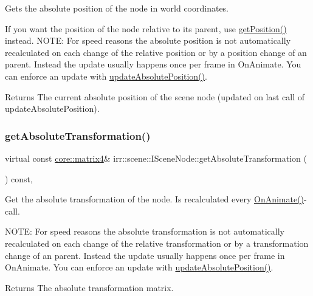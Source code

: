 Gets the absolute position of the node in world coordinates. 

If you want the position of the node relative to its parent, use \hyperlink{classirr_1_1scene_1_1ISceneNode_af5686d35e868e7d295c2d2cb84799d20}{get\+Position()} instead. N\+O\+TE\+: For speed reasons the absolute position is not automatically recalculated on each change of the relative position or by a position change of an parent. Instead the update usually happens once per frame in On\+Animate. You can enforce an update with \hyperlink{classirr_1_1scene_1_1ISceneNode_aeb6e0dc034bb2101600ce87acbcf0f6e}{update\+Absolute\+Position()}. \begin{DoxyReturn}{Returns}
The current absolute position of the scene node (updated on last call of update\+Absolute\+Position). 
\end{DoxyReturn}
\mbox{\label{classirr_1_1scene_1_1ISceneNode_af13dc546a7be796cc0868a2eec51e508}} 
\subsubsection{\texorpdfstring{get\+Absolute\+Transformation()}{getAbsoluteTransformation()}}
{\footnotesize\ttfamily virtual const \hyperlink{namespaceirr_1_1core_a73fa92e638c5ca97efd72da307cc9b65}{core\+::matrix4}\& irr\+::scene\+::\+I\+Scene\+Node\+::get\+Absolute\+Transformation (\begin{DoxyParamCaption}{ }\end{DoxyParamCaption}) const\hspace{0.3cm}{\ttfamily [inline]}, {\ttfamily [virtual]}}



Get the absolute transformation of the node. Is recalculated every \hyperlink{classirr_1_1scene_1_1ISceneNode_afc1dcb5cb19116d0c7aa3d4ebdf04cc5}{On\+Animate()}-\/call. 

N\+O\+TE\+: For speed reasons the absolute transformation is not automatically recalculated on each change of the relative transformation or by a transformation change of an parent. Instead the update usually happens once per frame in On\+Animate. You can enforce an update with \hyperlink{classirr_1_1scene_1_1ISceneNode_aeb6e0dc034bb2101600ce87acbcf0f6e}{update\+Absolute\+Position()}. \begin{DoxyReturn}{Returns}
The absolute transformation matrix. 
\end{DoxyReturn}
\mbox{\label{classirr_1_1scene_1_1ISceneNode_a454fc115d9afa89623c55deba8a4add1}} 
